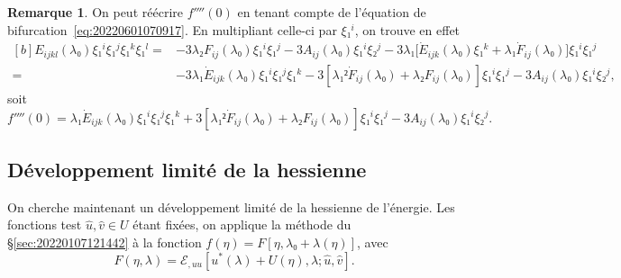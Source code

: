 \documentclass[12pt, final]{scrartcl}
\theoremstyle{definition}
\newtheorem{remark}{Remarque}
\begin{document}
\begin{remark}
  On peut réécrire \(f''''(0)\) en tenant compte de l'équation de
  bifurcation~\eqref{eq:20220601070917}. En multipliant celle-ci par \(ξ₁^i\),
  on trouve en effet
 \begin{equation*}
   \begin{aligned}[b]
     E_{i j k l}(λ₀) ξ₁^i ξ₁^j ξ₁^k ξ₁^l
     ={} & - 3 λ₂ F_{i j}(λ₀) ξ₁^i ξ₁^j - 3 A_{i j}(λ₀) ξ₁^i ξ₂^j - 3 λ₁ \bigl[\dot{E}_{i j k} (λ₀) ξ₁^k + λ₁ \dot{F}_{i j}(λ₀)\bigr] ξ₁^i ξ₁^j\\
     ={} & - 3 λ₁ \dot{E}_{i j k}(λ₀) ξ₁^i ξ₁^j ξ₁^k - 3 [λ₁² \dot{F}_{i j} (λ₀) + λ₂ F_{i j}(λ₀)] ξ₁^i ξ₁^j - 3 A_{i j}(λ₀) ξ₁^i ξ₂^j,
   \end{aligned}
 \end{equation*}
 soit
 \begin{equation}
   f''''(0) = λ₁ \dot{E}_{i j k}(λ₀) ξ₁^i ξ₁^j ξ₁^k + 3 [λ₁² \dot{F}_{i j} (λ₀) + λ₂ F_{i j}(λ₀)] ξ₁^i ξ₁^j - 3 A_{i j}(λ₀) ξ₁^i ξ₂^j.
 \end{equation}
\end{remark}

\subsection{Développement limité de la hessienne}

On cherche maintenant un développement limité de la hessienne de l'énergie. Les
fonctions test \(\hat{u}, \hat{v} ∈ U\) étant fixées, on applique la méthode du
\S\ref{sec:20220107121442} à la fonction \(f(η) = F [η, λ₀ + λ(η)]\), avec
\begin{equation}
  F(η, λ) =ℰ_{, u u} [u^{\ast}(λ) + U(η), λ; \hat{u}, \hat{v}].
\end{equation}
\end{document}

